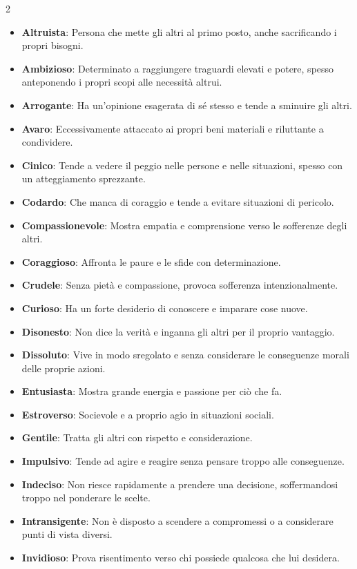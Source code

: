\begin{multicols}{2}
\noindent\begin{itemize}[leftmargin=*] \setlength{\itemsep}{0pt}
	\item \textbf{Altruista}: Persona che mette gli altri al primo posto, anche sacrificando i propri bisogni.
        \item \textbf{Ambizioso}: Determinato a raggiungere traguardi elevati e potere, spesso anteponendo i propri scopi alle necessità altrui.
	\item \textbf{Arrogante}: Ha un'opinione esagerata di sé stesso e tende a sminuire gli altri.
	\item \textbf{Avaro}: Eccessivamente attaccato ai propri beni materiali e riluttante a condividere.
	\item \textbf{Cinico}: Tende a vedere il peggio nelle persone e nelle situazioni, spesso con un atteggiamento sprezzante.
	\item \textbf{Codardo}: Che manca di coraggio e tende a evitare situazioni di pericolo.
	\item \textbf{Compassionevole}: Mostra empatia e comprensione verso le sofferenze degli altri.
	\item \textbf{Coraggioso}: Affronta le paure e le sfide con determinazione.
	\item \textbf{Crudele}: Senza pietà e compassione, provoca sofferenza intenzionalmente.
	\item \textbf{Curioso}: Ha un forte desiderio di conoscere e imparare cose nuove.
	\item \textbf{Disonesto}: Non dice la verità e inganna gli altri per il proprio vantaggio.
	\item \textbf{Dissoluto}: Vive in modo sregolato e senza considerare le conseguenze morali delle proprie azioni.
	\item \textbf{Entusiasta}: Mostra grande energia e passione per ciò che fa.
	\item \textbf{Estroverso}: Socievole e a proprio agio in situazioni sociali.
	\item \textbf{Gentile}: Tratta gli altri con rispetto e considerazione.
	\item \textbf{Impulsivo}: Tende ad agire e reagire senza pensare troppo alle conseguenze.
        \item \textbf{Indeciso}: Non riesce rapidamente a prendere una decisione, soffermandosi troppo nel ponderare le scelte.
	\item \textbf{Intransigente}: Non è disposto a scendere a compromessi o a considerare punti di vista diversi.
	\item \textbf{Invidioso}: Prova risentimento verso chi possiede qualcosa che lui desidera.

\end{itemize}
\end{multicols}
